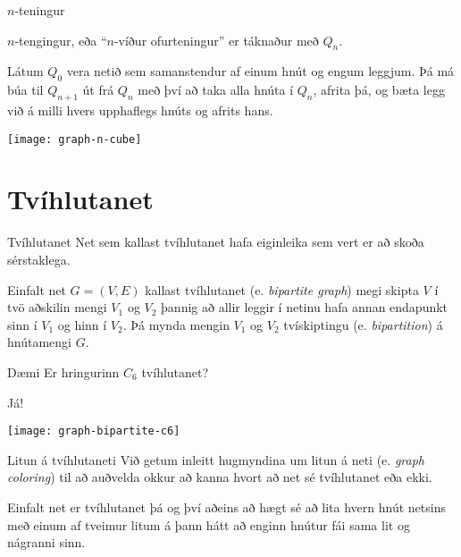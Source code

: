 \documentclass[handout]{beamer}
\begin{document}
\begin{frame}{$n$-teningur}
\begin{tcolorbox}[title=$n$-teningur]
$n$-tengingur, eða ``$n$-víður ofurteningur'' er táknaður með $Q_n$.

Látum $Q_0$ vera netið sem samanstendur af einum hnút og engum leggjum. Þá má búa til $Q_{n+1}$ út frá $Q_n$ með því að taka alla hnúta í $Q_n$, afrita þá, og bæta legg við á milli hvers upphaflegs hnúts og afrits hans.
\end{tcolorbox}

\begin{center}
\texttt{[image: graph-n-cube]}
\end{center}
\end{frame}

\section{Tvíhlutanet}

\begin{frame}{Tvíhlutanet}
Net sem kallast tvíhlutanet hafa eiginleika sem vert er að skoða sérstaklega.
\begin{tcolorbox}[title=Tvíhlutanet]
Einfalt net $G = (V,E)$ kallast tvíhlutanet (e. \emph{bipartite graph}) megi skipta $V$ í tvö aðskilin mengi $V_1$ og $V_2$ þannig að allir leggir í netinu hafa annan endapunkt sinn í $V_1$ og hinn í $V_2$. Þá mynda mengin $V_1$ og $V_2$ tvískiptingu (e. \emph{bipartition}) á hnútamengi $G$.
\end{tcolorbox}

\end{frame}

\begin{frame}{Dæmi}
Er hringurinn $C_6$ tvíhlutanet? \pause

\begin{center}
Já!

\texttt{[image: graph-bipartite-c6]}
\end{center}
\end{frame}

\begin{frame}{Litun á tvíhlutaneti}
Við getum inleitt hugmyndina um litun á neti (e. \emph{graph coloring}) til að auðvelda okkur að kanna hvort að net sé tvíhlutanet eða ekki.

\begin{tcolorbox}[title=Litun tvíhlutanets]
Einfalt net er tvíhlutanet þá og því aðeins að hægt sé að lita hvern hnút netsins með einum af tveimur litum á þann hátt að enginn hnútur fái sama lit og nágranni sinn.
\end{tcolorbox}

\end{frame}
\end{document}

